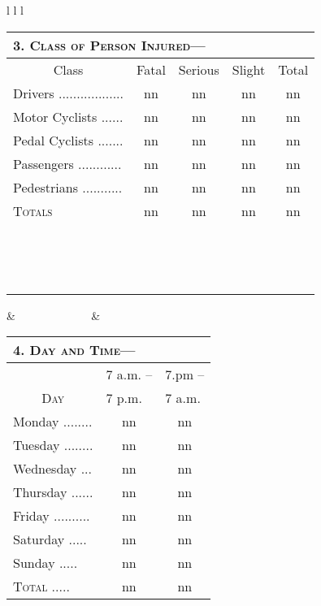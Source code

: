 \documentclass{article}
\begin{document}
\newpage

\flushleft

\begin{tabular}{ l l l } %

\begin{tabular}{l | c | c | c | c}
\multicolumn{5}{l}{\textsc{3. Class of Person Injured---}} \\
\hline
\multicolumn{1}{c|}{Class} & Fatal & Serious & Slight & Total \\
\hline
Drivers .................. & {\Large nn} & {\Large nn} & {\Large nn} & {\Large nn} \\
\cline{2-5}
Motor Cyclists ...... & {\Large nn} & {\Large nn} & {\Large nn} & {\Large nn} \\
\cline{2-5}
Pedal Cyclists ....... & {\Large nn} & {\Large nn} & {\Large nn} & {\Large nn} \\
\cline{2-5}
Passengers ............ & {\Large nn} & {\Large nn} & {\Large nn} & {\Large nn} \\
\cline{2-5}
Pedestrians ........... & {\Large nn} & {\Large nn} & {\Large nn} & {\Large nn} \\
\hline
\textsc{Totals} & {\Large nn} & {\Large nn} & {\Large nn} & {\Large nn} \\
\hline

\multicolumn{5}{c}{ ~~ } \\
\multicolumn{5}{c}{ ~~ } \\
\multicolumn{5}{c}{ ~~ } \\
\end{tabular}

& ~~~~~~~~~~~~ &
\begin{tabular}{ l |c| c }
\multicolumn{3}{l}{\textsc{4. Day and Time---}} \\
\hline
                         			          & \multicolumn{1}{l|}{7 a.m. --} & \multicolumn{1}{l}{7.pm --} \\
\multicolumn{1}{c|}{\textsc{Day} } & \multicolumn{1}{l|}{7 p.m.} & \multicolumn{1}{l}{7 a.m.} \\
\hline
Monday ........ & \Large{nn} & \Large{nn} \\
\cline{2-3}
Tuesday ........ & \Large{nn} & \Large{nn} \\
\cline{2-3}
Wednesday ... & \Large{nn} & \Large{nn} \\
\cline{2-3}
Thursday ...... & \Large{nn} & \Large{nn} \\
\cline{2-3}
Friday .......... & \Large{nn} & \Large{nn} \\
\cline{2-3}
Saturday ..... & \Large{nn} & \Large{nn} \\
\cline{2-3}
Sunday ..... & \Large{nn} & \Large{nn} \\
\hline
\textsc{Total} ..... & \Large{nn} & \Large{nn} \\
\hline
\end{tabular}


\end{tabular}
\end{document}
